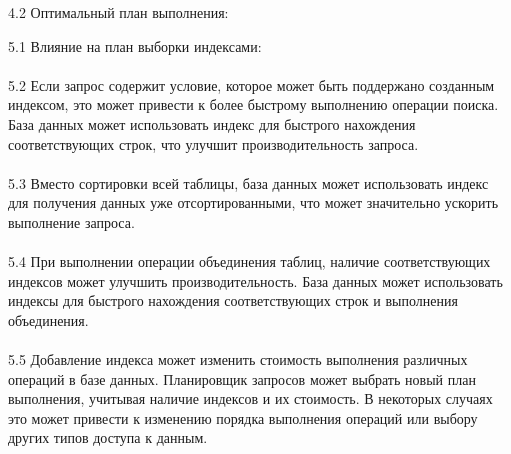 \documentclass{article}
\begin{document}
4.2 Оптимальный план выполнения: 
\begin{center}
\end{center}
5.1 Влияние на план выборки индексами:
\\ \\ 5.2 Если запрос содержит условие, которое может быть поддержано созданным индексом, это может привести к более быстрому выполнению операции поиска. База данных может использовать индекс для быстрого нахождения соответствующих строк, что улучшит производительность запроса.
\\ \\ 5.3 Вместо сортировки всей таблицы, база данных может использовать индекс для получения данных уже отсортированными, что может значительно ускорить выполнение запроса.
\\ \\ 5.4 При выполнении операции объединения таблиц, наличие соответствующих индексов может улучшить производительность. База данных может использовать индексы для быстрого нахождения соответствующих строк и выполнения объединения.
\\ \\ 5.5 Добавление индекса может изменить стоимость выполнения различных операций в базе данных. Планировщик запросов может выбрать новый план выполнения, учитывая наличие индексов и их стоимость. В некоторых случаях это может привести к изменению порядка выполнения операций или выбору других типов доступа к данным.
\end{document}
